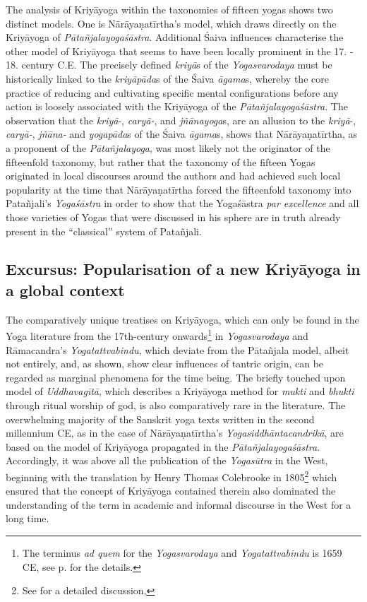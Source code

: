 The analysis of Kriyāyoga within the taxonomies of fifteen yogas shows two distinct models. One is Nārāyaṇatīrtha's model, which draws directly on the Kriyāyoga of \textit{Pātañjalayogaśāstra}. Additional Śaiva influences characterise the other model of Kriyāyoga that seems to have been locally prominent in the 17. - 18. century C.E. The precisely defined \textit{kriyā}s of the \textit{Yogasvarodaya} must be historically linked to the \textit{kriyāpāda}s of the Śaiva \textit{āgama}s, whereby the core practice of reducing and cultivating specific mental configurations before any action is loosely associated with the Kriyāyoga of the \textit{Pātañjalayogaśāstra}. The observation that the \textit{kriyā}-, \textit{caryā-}, and \textit{jñānayoga}s, are an allusion to the \textit{kriyā}-, \textit{caryā-}, \textit{jñāna-} and \textit{yogapāda}s of the Śaiva \textit{āgama}s, shows that Nārāyaṇatīrtha, as a proponent of the \textit{Pātañjalayoga}, was most likely not the originator of the fifteenfold taxonomy, but rather that the taxonomy of the fifteen Yogas originated in local discourses around the authors and had achieved such local popularity at the time that Nārāyaṇatīrtha forced the fifteenfold taxonomy into Patañjali's \textit{Yogaśāstra} in order to show that the Yogaśāstra \textit{par excellence} and all those varieties of Yogas that were discussed in his sphere are in truth already present in the ``classical'' system of Patañjali.

\subsection{Excursus: Popularisation of a new Kriyāyoga in a global context}
\label{excursus}
The comparatively unique treatises on Kriyāyoga, which can only be found in the Yoga literature from the 17th-century onwards\footnote{The terminus \textit{ad quem} for the \textit{Yogasvarodaya} and \textit{Yogatattvabindu} is 1659 CE, see p.\pageref{dating} for the details.} in \textit{Yogasvarodaya} and Rāmacandra's \textit{Yogatattvabindu}, which deviate from the Pātañjala model, albeit not entirely, and, as shown, show clear influences of tantric origin, can be regarded as marginal phenomena for the time being. The briefly touched upon model of \textit{Uddhavagītā}, which describes a Kriyāyoga method for \textit{mukti} and \textit{bhukti} through ritual worship of god, is also comparatively rare in the literature. The overwhelming majority of the Sanskrit yoga texts written in the second millennium CE, as in the case of Nārāyaṇatīrtha's \textit{Yogasiddhāntacandrikā}, are based on the model of Kriyāyoga propagated in the \textit{Pātañjalayogaśāstra}. Accordingly, it was above all the publication of the \textit{Yogasūtra} in the West, beginning with the translation by Henry Thomas Colebrooke in 1805\footnote{See \parencite{colebrooke2014} for a detailed discussion,} which ensured that the concept of Kriyāyoga contained therein also dominated the understanding of the term in academic and informal discourse in the West for a long time. 

